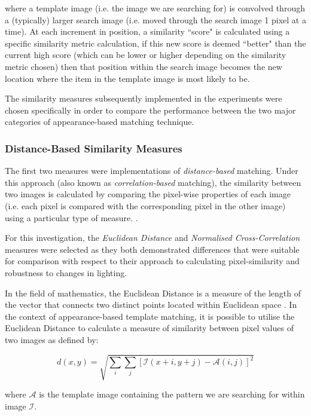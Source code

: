 where a template image (i.e. the image we are searching for) is convolved through a (typically) larger search image (i.e. moved through the search image 1 pixel at a time). At each increment in position,  a similarity ``score" is calculated using a specific similarity metric calculation, if this new score is deemed ``better" than the current high score (which can be lower or higher depending on the similarity metric chosen) then that position within the search image becomes the new location where the item in the template image is most likely to be.

The similarity measures subsequently implemented in the experiments were chosen specifically in order to compare the performance between the two major categories of appearance-based matching technique. 

\subsubsection{Distance-Based Similarity Measures}

The first two measures were implementations of \textit{distance-based} matching. Under this approach (also known as \textit{correlation-based} matching), the similarity between two images is calculated by comparing the pixel-wise properties of each image (i.e. each pixel is compared with the corresponding pixel in the other image) using a particular type of measure. \cite{szeliski}. 

For this investigation, the \textit{Euclidean Distance} and \textit{Normalised Cross-Correlation} measures were selected as they both demonstrated differences that were suitable for comparison with respect to their approach to calculating pixel-similarity and robustness to changes in lighting. 

In the field of mathematics, the Euclidean Distance is a measure of the length of the vector that connects two distinct points located within Euclidean space \cite{szeliski}. In the context of appearance-based template matching, it is possible to utilise the Euclidean Distance to calculate a measure of similarity between pixel values of two images as defined by:

\begin{equation}
d(x, y) = \sqrt{\sum\limits_{i}\sum\limits_{j}[\mathcal{I}(x + i, y + j) - \mathcal{A}(i, j)]^2}
\end{equation}

where $\mathcal{A}$ is the template image containing the pattern we are searching for within image $\mathcal{I}$. 

